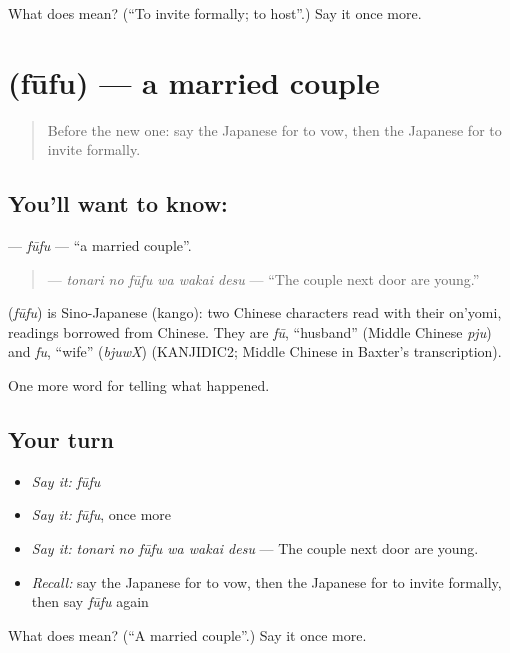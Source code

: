 \begin{tcolorbox}[breakable,colback=teal!4,colframe=teal!35!black,title={Before you move on}]
What does  mean? (\textquotedblleft{}To invite formally; to host\textquotedblright{}.) Say it once more.
\end{tcolorbox}
\section[\texorpdfstring{\ja{ふうふ} (fūfu)}{ふうふ (fūfu)}]{ (fūfu) — a married couple}

\label{lesson:JA-C289-fuufu}



\begin{quote}
Before the new one: say the Japanese for to vow, then the Japanese for to invite formally.
\end{quote}

\subsection*{You'll want to know: }
\textbf{} — \emph{fūfu} — \textquotedblleft{}a married couple\textquotedblright{}.

\begin{quote}
\textbf{  } — \emph{tonari no fūfu wa wakai desu} — \textquotedblleft{}The couple next door are young.\textquotedblright{}
\end{quote}

\begin{cousinweb}
\textbf{} (\emph{fūfu}) is Sino-Japanese (kango): two Chinese characters read with their on'yomi, readings borrowed from Chinese. They are \emph{fū}, \textquotedblleft{}husband\textquotedblright{} (Middle Chinese \emph{pju}) and \emph{fu}, \textquotedblleft{}wife\textquotedblright{} (\emph{bjuwX}) (KANJIDIC2; Middle Chinese in Baxter's transcription).
\end{cousinweb}

\begin{grammarlens}[title={What you've built}]
One more word for telling what happened.
\end{grammarlens}

\subsection*{Your turn}
\begin{itemize}
\raggedright
  \item \emph{Say it:} \emph{fūfu}
  \item \emph{Say it:} \emph{fūfu}, once more
  \item \emph{Say it:} \emph{tonari no fūfu wa wakai desu} — The couple next door are young.
  \item \emph{Recall:} say the Japanese for to vow, then the Japanese for to invite formally, then say \emph{fūfu} again
\end{itemize}

\begin{tcolorbox}[breakable,colback=teal!4,colframe=teal!35!black,title={Before you move on}]
What does  mean? (\textquotedblleft{}A married couple\textquotedblright{}.) Say it once more.
\end{tcolorbox}
